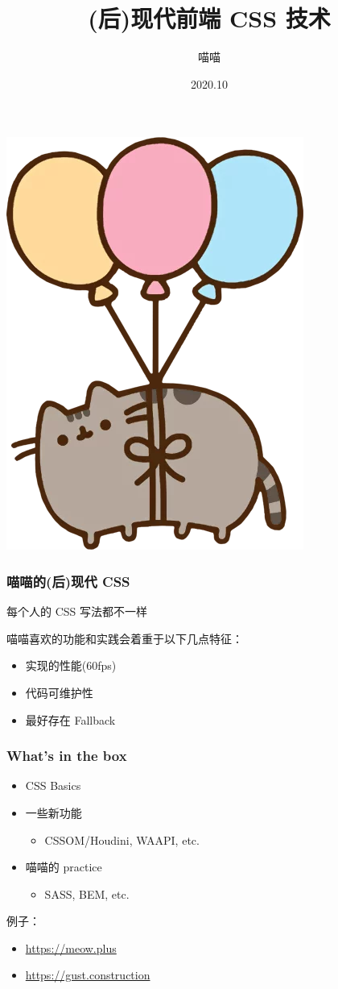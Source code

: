 \documentclass[UTF-8]{ctexbeamer}
\title{(后)现代前端 CSS 技术}
\author{喵喵}
\date{2020.10}
\begin{document}
\begin{frame}
  \titlepage
  \begin{center}
    \includegraphics[width=.1\textwidth]{assets/float.png}
  \end{center}
\end{frame}

\begin{frame}
  \frametitle{喵喵的(后)现代 CSS}

  每个人的 CSS 写法都不一样
  
  \vspace{1em}
  
  喵喵喜欢的功能和实践会着重于以下几点特征：

  \begin{itemize}
    \item 实现的性能(60fps)
    \item 代码可维护性
    \item 最好存在 Fallback
  \end{itemize}
\end{frame}

\begin{frame}
  \frametitle{What's in the box}
  \begin{itemize}
    \item CSS Basics
    \item 一些新功能
    \begin{itemize}
      \item CSSOM/Houdini, WAAPI, etc.
    \end{itemize}
    \item 喵喵的 practice
    \begin{itemize}
      \item SASS, BEM, etc.
    \end{itemize}
  \end{itemize}

  \pause

  \vspace{2em}
  例子：
  \begin{itemize}
    \item \url{https://meow.plus}
    \item \url{https://gust.construction}
  \end{itemize}
\end{frame}
\end{document}
